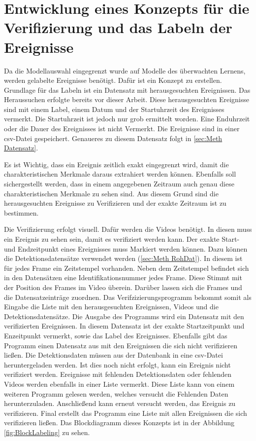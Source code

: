 \section{Entwicklung eines Konzepts für die Verifizierung und das Labeln der Ereignisse}
Da die Modellauswahl eingegrenzt wurde auf Modelle des überwachten Lernens, werden gelabelte Ereignisse benötigt. Dafür ist ein Konzept zu erstellen. Grundlage für das Labeln ist ein Datensatz mit herausgesuchten Ereignissen. Das Heraussuchen erfolgte bereits vor dieser Arbeit. Diese herausgesuchten Ereignisse sind mit einem Label, einem Datum und der Startuhrzeit des Ereignisses vermerkt. Die Startuhrzeit ist jedoch nur grob ermittelt worden. Eine Enduhrzeit oder die Dauer des Ereignisses ist nicht Vermerkt. Die Ereignisse sind in einer csv-Datei gespeichert. Genaueres zu diesem Datensatz folgt in  \ref{sec:Meth Datensatz}. \par

Es ist Wichtig, dass ein Ereignis zeitlich exakt eingegrenzt wird, damit die charakteristischen Merkmale daraus extrahiert werden können. Ebenfalls soll sichergestellt werden, dass in einem angegebenen Zeitraum auch genau diese charakteristischen Merkmale zu sehen sind. Aus diesem Grund sind die herausgesuchten Ereignisse zu Verifizieren und der exakte Zeitraum ist zu bestimmen. \par 

Die Verifizierung erfolgt visuell. Dafür werden die Videos benötigt. In diesen muss ein Ereignis zu sehen sein, damit es verifiziert werden kann. Der exakte Start- und Endzeitpunkt eines Ereignisses muss Markiert werden können. Dazu können die Detektionsdatensätze verwendet werden (\ref{sec:Meth RohDat}). In diesem ist für jedes Frame ein Zeitstempel vorhanden. Neben dem Zeitstempel befindet sich in den Datensätzen eine Identifikationsnummer jedes Frame. Diese Stimmt mit der Position des Frames im Video überein. Darüber lassen sich die Frames und die Datensatzeinträge zuordnen. Das Verifzizierungsprogramm bekommt somit als Eingabe die Liste mit den herausgesuchten Ereignissen, Videos und die Detektionsdatensätze. Die Ausgabe des Programms wird ein Datensatz mit den verifizierten Ereignissen. In diesem Datensatz ist der exakte Startzeitpunkt und Enzeitpunkt vermerkt, sowie das Label des Ereignisses. Ebenfalls gibt das Programm einen Datensatz aus mit den Ereignissen die sich nicht verifizieren ließen. Die Detektionsdaten müssen aus der Datenbank in eine csv-Datei heruntergeladen werden. Ist dies noch nicht erfolgt, kann ein Ereignis nicht verifiziert werden. Ereignisse mit fehlenden Detektionsdaten oder fehlenden Videos werden ebenfalls in einer Liste vermerkt. Diese Liste kann von einem weiteren Programm gelesen werden, welches versucht die Fehlenden Daten herunterzuladen. Anschließend kann erneut versucht werden, das Ereignis zu verifizieren. Final erstellt das Programm eine Liste mit allen Ereignissen die sich verifizieren ließen. Das Blockdiagramm dieses Konzepts ist in der Abbildung \ref{fig:BlockLabeling} zu sehen. 

